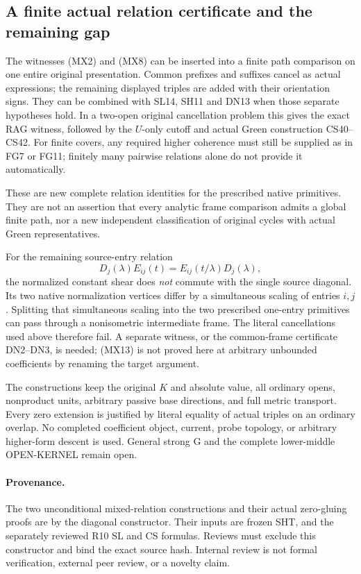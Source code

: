 \subsection{A finite actual relation certificate and the remaining gap}

The witnesses (MX2) and (MX8) can be inserted into a finite
path comparison on one entire original presentation.
Common prefixes and suffixes cancel as actual expressions;
the remaining displayed triples are added with their
orientation signs.  They can be combined with SL14,
SH11 and DN13 when those separate hypotheses hold.
In a two-open original cancellation problem this gives
the exact RAG witness, followed by the $U$-only cutoff
and actual Green construction CS40--CS42.  For finite
covers, any required higher coherence must still be
supplied as in FG7 or FG11; finitely many pairwise
relations alone do not provide it automatically.

These are new complete relation identities for the
prescribed native primitives.  They are not an assertion
that every analytic frame comparison admits a global
finite path, nor a new independent classification of
original cycles with actual Green representatives.

For the remaining source-entry relation
\[
           D_j(\lambda)E_{ij}(t)
                         =E_{ij}(t/\lambda)D_j(\lambda),
                                                               \tag{MX13}
\]
the normalized constant shear does \emph{not} commute
with the single source diagonal.  Its two native
normalization vertices differ by a simultaneous scaling
of entries $i,j$.  Splitting that simultaneous scaling
into the two prescribed one-entry primitives can pass
through a nonisometric intermediate frame.  The
literal cancellations used above therefore fail.
A separate witness, or the common-frame certificate
DN2--DN3, is needed; (MX13) is not proved here at arbitrary
unbounded coefficients by renaming the target argument.

The constructions keep the original $K$ and absolute
value, all ordinary opens, nonproduct units, arbitrary
passive base directions, and full metric transport.
Every zero extension is justified by literal equality
of actual triples on an ordinary overlap.  No completed
coefficient object, current, probe topology, or arbitrary
higher-form descent is used.  General strong G and
the complete lower-middle OPEN-KERNEL remain open.

\paragraph{Provenance.}
The two unconditional mixed-relation constructions and
their actual zero-gluing proofs are by the diagonal
constructor.  Their inputs are frozen SHT, and the
separately reviewed R10 SL and CS formulas.  Reviews
must exclude this constructor and bind the exact source
hash.  Internal review is not formal verification,
external peer review, or a novelty claim.

